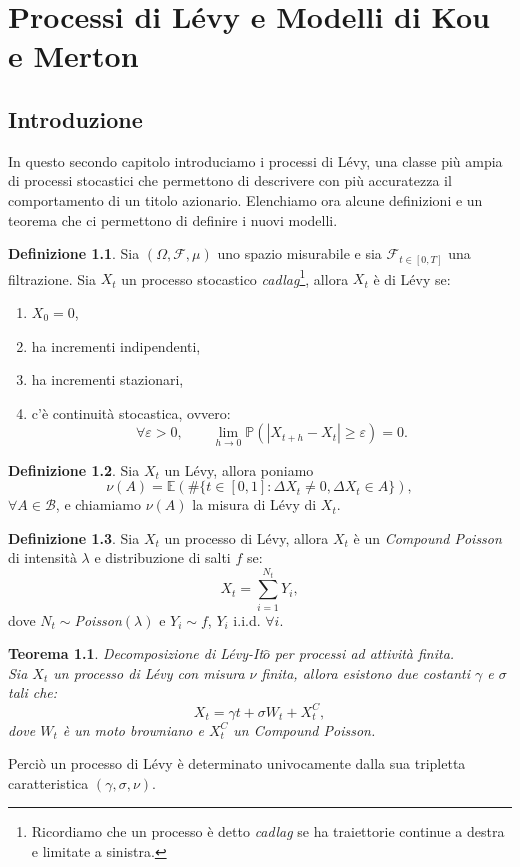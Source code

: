 \documentclass[a4paper,10pt]{report}
\theoremstyle{plain}
\newtheorem{theorem}{Teorema}[chapter]
\theoremstyle{definition}
\newtheorem{definition}{Definizione}[chapter]
\theoremstyle{remark}
\begin{document}
\chapter{Processi di L\'evy e Modelli di Kou e Merton}
\section{Introduzione}
In questo secondo capitolo introduciamo i processi di L\'evy, una classe pi\`u ampia di processi stocastici che permettono di descrivere con pi\`u accuratezza il comportamento di un titolo azionario. Elenchiamo ora alcune definizioni e un teorema che ci permettono di definire i nuovi modelli.
\begin{definition}
Sia $(\Omega, \mathcal{F}, \mu)$ uno spazio misurabile e sia $\mathcal{F}_{t\in[0,T]}$ una filtrazione. Sia $X_t$ un processo stocastico \emph{cadlag}\footnote{Ricordiamo che un processo \`e detto \emph{cadlag} se ha traiettorie continue a destra e limitate a sinistra.}, allora $X_t$ \`e di L\'evy se:
\begin{enumerate}
\item $X_0=0$,
\item ha incrementi indipendenti,
\item ha incrementi stazionari,
\item c'\`e continuit\`a stocastica, ovvero: $$\forall \varepsilon >0,\qquad\lim_{h\to0}\mathbb{P}(|X_{t+h}-X_t|\geq\varepsilon)=0.$$
\end{enumerate}
\end{definition}
\begin{definition}
Sia $X_t$ un L\'evy, allora poniamo $$\nu(A)=\mathbb{E}(\#\{t\in[0,1]: \Delta X_t\neq0, \Delta X_t\in A\}),$$ $\forall A\in \mathcal{B}$, e chiamiamo $\nu(A)$ la misura di L\'evy di $X_t$.
\end{definition}
\begin{definition}
Sia $X_t$ un processo di L\'evy, allora $X_t$ \`e un \emph{Compound Poisson} di intensit\`a $\lambda$ e distribuzione di salti $f$ se: $$X_t=\sum_{i=1}^{N_t}Y_i,$$ dove $N_t\sim$\emph{Poisson}$(\lambda)$ e $Y_i\sim f$, $Y_i$ i.i.d. $\forall i$.
\end{definition}
\begin{theorem}
Decomposizione di L\'evy-It$\hat{o}$ per processi ad attività finita.\\Sia $X_t$ un processo di L\'evy con misura $\nu$ finita, allora esistono due costanti $\gamma$ e $\sigma$ tali che:$$X_t=\gamma t+\sigma W_t+X^C_t,$$ dove $W_t$ \`e un moto browniano e $X^C_t$ un \emph{Compound Poisson}.
\end{theorem}
Perci\`o un processo di L\'evy \`e determinato univocamente dalla sua tripletta caratteristica $(\gamma, \sigma, \nu)$.
\end{document}

